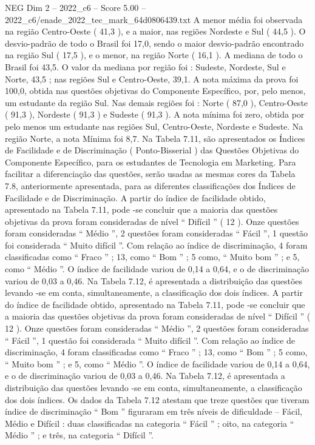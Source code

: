 \begin{textsample}{NEG Dim 2 – 2022\_c6 – Score 5.00 – 2022\_c6/enade\_2022\_tec\_mark\_64d0806439.txt}
A menor média foi observada na região Centro-Oeste ( 41,3 ), e a maior, nas regiões Nordeste e Sul ( 44,5 ).
O desvio-padrão de todo o Brasil foi 17,0, sendo o maior desvio-padrão encontrado na região Sul ( 17,5 ), e o menor, na região Norte ( 16,1 ).
A mediana de todo o Brasil foi 43,5.
O valor da mediana por região foi : Sudeste, Nordeste, Sul e Norte, 43,5 ; nas regiões Sul e Centro-Oeste, 39,1.
A nota máxima da prova foi 100,0, obtida nas questões objetivas do Componente Específico, por, pelo menos, um estudante da região Sul.
Nas demais regiões foi : Norte ( 87,0 ), Centro-Oeste ( 91,3 ), Nordeste ( 91,3 ) e Sudeste ( 91,3 ).
A nota mínima foi zero, obtida por pelo menos um estudante nas regiões Sul, Centro-Oeste, Nordeste e Sudeste.
Na região Norte, a nota Mínima foi 8,7.
Na Tabela 7.11, são apresentados os Índices de Facilidade e de Discriminação ( Ponto-Bisserial ) das Questões Objetivas do Componente Específico, para os estudantes de Tecnologia em Marketing.
Para facilitar a diferenciação das questões, serão usadas as mesmas cores da Tabela 7.8, anteriormente apresentada, para as diferentes classificações dos Índices de Facilidade e de Discriminação.
A partir do índice de facilidade obtido, apresentado na Tabela 7.11, pode -se concluir que a maioria das questões objetivas da prova foram consideradas de nível “ Difícil ” ( 12 ).
Onze questões foram consideradas “ Médio ”, 2 questões foram consideradas “ Fácil ”, 1 questão foi considerada “ Muito difícil ”.
Com relação ao índice de discriminação, 4 foram classificadas como “ Fraco ” ; 13, como “ Bom ” ; 5 como, “ Muito bom ” ; e 5, como “ Médio ”.
O índice de facilidade variou de 0,14 a 0,64, e o de discriminação variou de 0,03 a 0,46.
Na Tabela 7.12, é apresentada a distribuição das questões levando -se em conta, simultaneamente, a classificação dos dois índices.
A partir do índice de facilidade obtido, apresentado na Tabela 7.11, pode -se concluir que a maioria das questões objetivas da prova foram consideradas de nível “ Difícil ” ( 12 ).
Onze questões foram consideradas “ Médio ”, 2 questões foram consideradas “ Fácil ”, 1 questão foi considerada “ Muito difícil ”.
Com relação ao índice de discriminação, 4 foram classificadas como “ Fraco ” ; 13, como “ Bom ” ; 5 como, “ Muito bom ” ; e 5, como “ Médio ”.
O índice de facilidade variou de 0,14 a 0,64, e o de discriminação variou de 0,03 a 0,46.
Na Tabela 7.12, é apresentada a distribuição das questões levando -se em conta, simultaneamente, a classificação dos dois índices.
Os dados da Tabela 7.12 atestam que treze questões que tiveram índice de discriminação “ Bom ” figuraram em três níveis de dificuldade – Fácil, Médio e Difícil : duas classificadas na categoria “ Fácil ” ; oito, na categoria “ Médio ” ; e três, na categoria “ Difícil ”.

\end{textsample}
